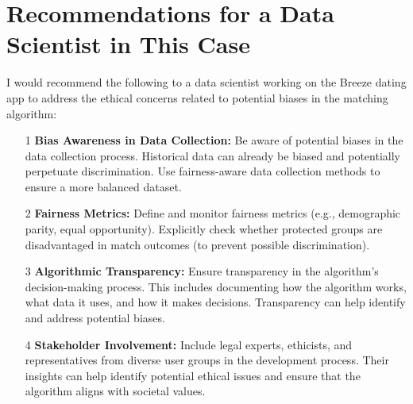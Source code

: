 \documentclass[11pt, twoside]{article}
\numberwithin{equation}{section}
\begin{document}
\section{Recommendations for a Data Scientist in This Case}
I would recommend the following to a data scientist working on the Breeze dating app to address the ethical concerns related to potential biases in the matching algorithm:
\begin{itemize}
    \item[1] \textbf{Bias Awareness in Data Collection:} Be aware of potential biases in the data collection process. Historical data can already be biased and potentially perpetuate discrimination. Use fairness-aware data collection methods to ensure a more balanced dataset.

    \item[2] \textbf{Fairness Metrics:} Define and monitor fairness metrics (e.g., demographic parity, equal opportunity). Explicitly check whether protected groups are disadvantaged in match outcomes (to prevent possible discrimination).
    
    \item[3] \textbf{Algorithmic Transparency:} Ensure transparency in the algorithm's decision-making process. This includes documenting how the algorithm works, what data it uses, and how it makes decisions. Transparency can help identify and address potential biases.
    
    \item[4] \textbf{Stakeholder Involvement:} Include legal experts, ethicists, and representatives from diverse user groups in the development process. Their insights can help identify potential ethical issues and ensure that the algorithm aligns with societal values.

\end{itemize}

\clearpage

\printbibliography[heading=bibintoc]
\end{document}
